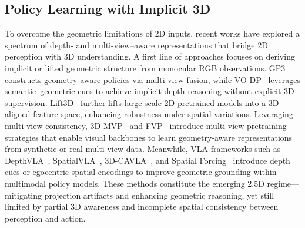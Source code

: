 \documentclass[runningheads]{llncs}
\begin{document}
\subsection{Policy Learning with Implicit 3D}
To overcome the geometric limitations of 2D inputs, recent works have explored a spectrum of depth- and multi-view–aware representations that bridge 2D perception with 3D understanding. A first line of approaches focuses on deriving implicit or lifted geometric structure from monocular RGB observations. GP3~\cite{qian2025gp33dgeometryawarepolicy} constructs geometry-aware policies via multi-view fusion, while VO-DP~\cite{ni2025vodpsemanticgeometricadaptivediffusion} leverages semantic–geometric cues to achieve implicit depth reasoning without explicit 3D supervision. Lift3D~\cite{jia2024lift3dfoundationpolicylifting} further lifts large-scale 2D pretrained models into a 3D-aligned feature space, enhancing robustness under spatial variations. Leveraging multi-view consistency, 3D-MVP~\cite{qian20253dmvp3dmultiviewpretraining} and FVP~\cite{Hou_2025_ICCV} introduce multi-view pretraining strategies that enable visual backbones to learn geometry-aware representations from synthetic or real multi-view data.  
Meanwhile, VLA frameworks such as DepthVLA~\cite{yuan2025depthvlaenhancingvisionlanguageactionmodels}, SpatialVLA~\cite{qu2025spatialvlaexploringspatialrepresentations}, 3D-CAVLA~\cite{bhat20253d}, and Spatial Forcing~\cite{li2025spatialforcingimplicitspatial} introduce depth cues or egocentric spatial encodings to improve geometric grounding within multimodal policy models. These methods constitute the emerging 2.5D regime—mitigating projection artifacts and enhancing geometric reasoning, yet still limited by partial 3D awareness and incomplete spatial consistency between perception and action.

\vspace{-0.06em}
\end{document}
